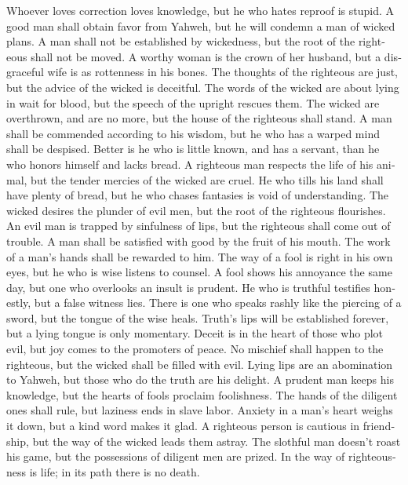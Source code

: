 \begin{paracol}{2}
\begin{otherlanguage}{english}
 Whoever loves correction loves knowledge, but he who
hates reproof is stupid.  A good man shall obtain favor
from Yahweh, but he will condemn a man of wicked plans.  A
man shall not be established by wickedness, but the root of the
righteous shall not be moved.  A worthy woman is the crown
of her husband, but a disgraceful wife is as rottenness in his bones.
 The thoughts of the righteous are just, but the advice of
the wicked is deceitful.  The words of the wicked are
about lying in wait for blood, but the speech of the upright rescues
them.  The wicked are overthrown, and are no more, but the
house of the righteous shall stand.  A man shall be
commended according to his wisdom, but he who has a warped mind shall be
despised.  Better is he who is little known, and has a
servant, than he who honors himself and lacks bread.  A
righteous man respects the life of his animal, but the tender mercies of
the wicked are cruel.  He who tills his land shall have
plenty of bread, but he who chases fantasies is void of understanding.
 The wicked desires the plunder of evil men, but the root
of the righteous flourishes.  An evil man is trapped by
sinfulness of lips, but the righteous shall come out of trouble.
 A man shall be satisfied with good by the fruit of his
mouth. The work of a man's hands shall be rewarded to him.
 The way of a fool is right in his own eyes, but he who
is wise listens to counsel.  A fool shows his annoyance
the same day, but one who overlooks an insult is prudent.
 He who is truthful testifies honestly, but a false
witness lies.  There is one who speaks rashly like the
piercing of a sword, but the tongue of the wise heals. 
Truth's lips will be established forever, but a lying tongue is only
momentary.  Deceit is in the heart of those who plot
evil, but joy comes to the promoters of peace.  No
mischief shall happen to the righteous, but the wicked shall be filled
with evil.  Lying lips are an abomination to Yahweh, but
those who do the truth are his delight.  A prudent man
keeps his knowledge, but the hearts of fools proclaim foolishness.
 The hands of the diligent ones shall rule, but laziness
ends in slave labor.  Anxiety in a man's heart weighs it
down, but a kind word makes it glad.  A righteous person
is cautious in friendship, but the way of the wicked leads them astray.
 The slothful man doesn't roast his game, but the
possessions of diligent men are prized.  In the way of
righteousness is life; in its path there is no death.


\end{otherlanguage}
\end{paracol}
